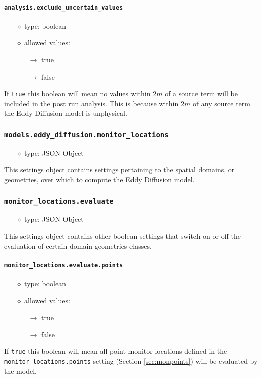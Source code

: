 \documentclass[]{article}
\def\code#1{\texttt{#1}}
\begin{document}
\paragraph{\code{analysis.exclude\_uncertain\_values}}\label{sec:excludevalue}
\begin{itemize}
    \item[$\diamond$] type: boolean
    \item[$\diamond$] allowed values:
    \begin{itemize}
        \item[$\rightarrow$] true
        \item[$\rightarrow$] false
    \end{itemize}
\end{itemize}
If \code{true} this boolean will mean no values within $2m$ of a source term
will be included in the post run analysis. This is because within $2m$ of any
source term the Eddy Diffusion model is unphysical.

\subsubsection{\code{models.eddy\_diffusion.monitor\_locations}}
\begin{itemize}
    \item[$\diamond$] type: JSON Object 
\end{itemize}
This settings object contains settings pertaining to the spatial domains, or
geometries, over which to compute the Eddy Diffusion model.

\subsubsection{\code{monitor\_locations.evaluate}}
\begin{itemize}
    \item[$\diamond$] type: JSON Object 
\end{itemize}
This settings object contains other boolean settings that switch on or off the
evaluation of certain domain geometries classes.

\paragraph{\code{monitor\_locations.evaluate.points}}
\begin{itemize}
    \item[$\diamond$] type: boolean
    \item[$\diamond$] allowed values:
    \begin{itemize}
        \item[$\rightarrow$] true
        \item[$\rightarrow$] false
    \end{itemize}
\end{itemize}
If \code{true} this boolean will mean all point monitor locations defined in the
\code{monitor\_locations.points} setting (Section \ref{sec:monpoints}) will be
evaluated by the model.
\end{document}
